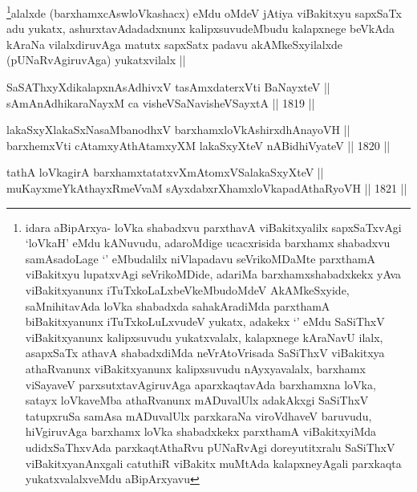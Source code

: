\begin{artha}
\footnote[1]{idara aBipArxya- loVka shabadxvu parxthavA
  viBakitxyalilx sapxSaTxvAgi `loVkaH' eMdu kANuvudu, adaroMdige
  ucacxrisida barxhamx shabadxvu samAsadoLage `\stext' eMbudalilx
  niVlapadavu seVrikoMDaMte parxthamA viBakitxyu lupatxvAgi
  seVrikoMDide, adariMa barxhamxshabadxkekx yAva viBakitxyanunx
  iTuTxkoLaLxbeVkeMbudoMdeV AkAMkeSxyide, saMnihitavAda loVka
  shabadxda sahakAradiMda parxthamA biBakitxyanunx iTuTxkoLuLxvudeV
  yukatx, adakekx `\stext' eMdu SaSiThxV viBakitxyanunx kalipxsuvudu
  yukatxvalalx, kalapxnege kAraNavU ilalx, asapxSaTx athavA
  shabadxdiMda neVrAtoVrisada SaSiThxV viBakitxya athaRvanunx
  viBakitxyanunx kalipxsuvudu nAyxyavalalx, barxhamx viSayaveV
  parxsutxtavAgiruvAga aparxkaqtavAda barxhamxna loVka, satayx
  loVkaveMba athaRvanunx mADuvalUlx adakAkxgi SaSiThxV tatupxruSa
  samAsa mADuvalUlx parxkaraNa viroVdhaveV baruvudu, hiVgiruvAga
  barxhamx loVka shabadxkekx parxthamA viBakitxyiMda udidxSaThxvAda
  parxkaqtAthaRvu pUNaRvAgi doreyutitxralu SaSiThxV viBakitxyanAnxgali
catuthiR viBakitx muMtAda kalapxneyAgali parxkaqta yukatxvalalxveMdu aBipArxyavu}alalxde (barxhamxcAswloVkashacx) eMdu oMdeV jAtiya
viBakitxyu sapxSaTx adu yukatx, ashurxtavAdadadxnunx kalipxsuvudeMbudu
kalapxnege beVkAda kAraNa vilalxdiruvAga matutx sapxSatx padavu
akAMkeSxyilalxde (pUNaRvAgiruvAga) yukatxvilalx ||
\end{artha}

\begin{shl}
SaSAThxyXdikalapxnA\s sAdhivxV tasAmxdaterxVti BaNayxteV || \\
sAmAnAdhikaraNayxM ca visheVSaNavisheVSayxtA ||  1819 ||  
\end{shl}
				
\begin{shl}
lakaSxyXlakaSxNasaMbanodhxV barxhamxloVkAshirxdhAnayoVH || \\
barxhemxVti cA\s \s tamxyAthAtamxyXM lakaSxyXteV nABidhiVyateV ||  1820 || 
\end{shl}
				
\begin{shl}
tathA loVkagirA barxhamxtatatxvXmAtomxVSalakaSxyXteV || \\
muKayxmeYkAthayxRmeVvaM sAyxdabxrXhamxloVkapadAthaRyoVH ||  1821 ||  
\end{shl}

